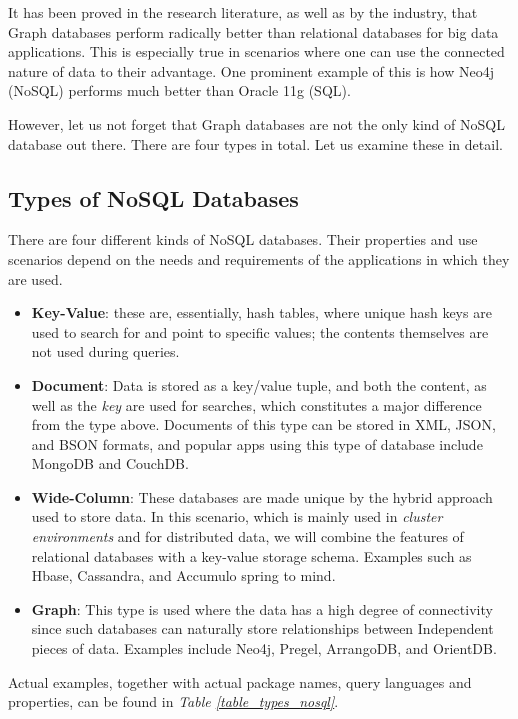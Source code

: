 \documentclass[10pt,        %
               a4paper,     %
               journal,     %
               ]{IEEEtran}
\begin{document}
It has been proved in the research literature, as well as by the industry, that Graph databases perform radically better than relational databases for big data applications. \cite{IEEEpaper1:comparison} This is especially true in scenarios where one can use the connected nature of data to their advantage. One prominent example of this is how Neo4j (NoSQL) performs much better than Oracle 11g (SQL). \cite{comparison_2015} \par
However, let us not forget that Graph databases are not the only kind of NoSQL database out there. There are four types in total. Let us examine these in detail.
\subsection{Types of NoSQL Databases}
There are four different kinds of NoSQL databases. Their properties and use scenarios depend on the needs and requirements of the applications in which they are used. 
\begin{itemize}
	\item \textbf{Key-Value}: these are, essentially, hash tables, where unique hash keys are used to search for and point to specific values; the contents themselves are not used during queries.
	\item \textbf{Document}: Data is stored as a key/value tuple, and both the content, as well as the \textit{key} are used for searches, which constitutes a major difference from the type above. Documents of this type can be stored in XML, JSON, and BSON formats, and popular apps using this type of database include MongoDB and CouchDB.
	\item \textbf{Wide-Column}: These databases are made unique by the hybrid approach used to store data. In this scenario, which is mainly used in \textit{cluster environments} and for distributed data, we will combine the features of relational databases with a key-value storage schema. Examples such as Hbase, Cassandra, and Accumulo spring to mind.
	\item \textbf{Graph}: This type is used where the data has a high degree of connectivity since such databases can naturally store relationships between Independent pieces of data. Examples include Neo4j, Pregel, ArrangoDB, and OrientDB. 
\end{itemize}
Actual examples, together with actual package names, query languages and properties, can be found in \textit{Table \ref{table_types_nosql}}. \cite{IEEEpaper1:comparison}
\end{document}
